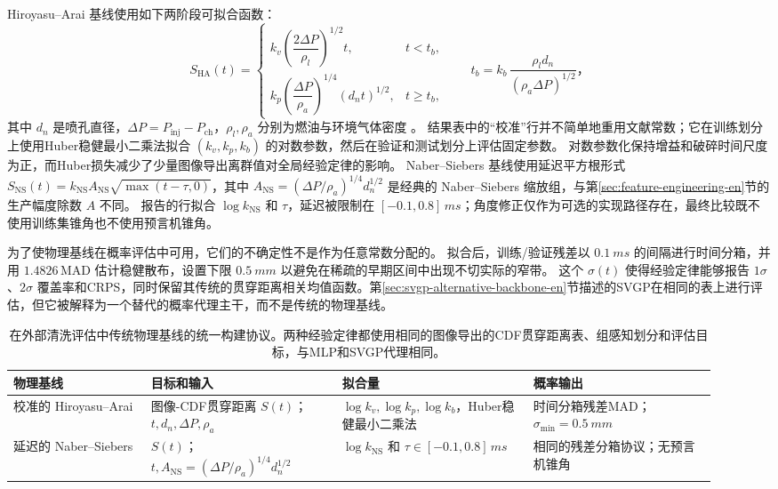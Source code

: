 Hiroyasu--Arai 基线使用如下两阶段可拟合函数：
\[
S_{\mathrm{HA}}(t)=
\begin{cases}
k_v \left( \dfrac{2\Delta P}{\rho_l} \right)^{1/2}t,
& t<t_b,\\[6pt]
k_p \left( \dfrac{\Delta P}{\rho_a} \right)^{1/4}(d_n t)^{1/2},
& t\ge t_b,
\end{cases}
\qquad
t_b=k_b\,\frac{\rho_l d_n}{(\rho_a\Delta P)^{1/2}}，
\]
其中 $d_n$ 是喷孔直径，$\Delta P=P_{\mathrm{inj}}-P_{\mathrm{ch}}$，$\rho_l,\rho_a$ 分别为燃油与环境气体密度 \cite{HiroyasuArai1990}。
结果表中的“校准”行并不简单地重用文献常数；它在训练划分上使用Huber稳健最小二乘法拟合 $(k_v,k_p,k_b)$ 的对数参数，然后在验证和测试划分上评估固定参数。
对数参数化保持增益和破碎时间尺度为正，而Huber损失减少了少量图像导出离群值对全局经验定律的影响。
Naber--Siebers 基线使用延迟平方根形式 $S_{\mathrm{NS}}(t)=k_{\mathrm{NS}}A_{\mathrm{NS}}\sqrt{\max(t-\tau,0)}$，其中 $A_{\mathrm{NS}}=(\Delta P/\rho_a)^{1/4}d_n^{1/2}$ 是经典的 Naber--Siebers 缩放组，与第\ref{sec:feature-engineering-en}节的生产幅度除数 $A$ 不同。
报告的行拟合 $\log k_{\mathrm{NS}}$ 和 $\tau$，延迟被限制在 $[-0.1,0.8]\,\si{ms}$；角度修正仅作为可选的实现路径存在，最终比较既不使用训练集锥角也不使用预言机锥角。

为了使物理基线在概率评估中可用，它们的不确定性不是作为任意常数分配的。
拟合后，训练/验证残差以 $\SI{0.1}{ms}$ 的间隔进行时间分箱，并用 $1.4826\,\mathrm{MAD}$ 估计稳健散布，设置下限 $\SI{0.5}{mm}$ 以避免在稀疏的早期区间中出现不切实际的窄带。
这个 $\sigma(t)$ 使得经验定律能够报告 $1\sigma$、$2\sigma$ 覆盖率和CRPS，同时保留其传统的贯穿距离相关均值函数。第\ref{sec:svgp-alternative-backbone-en}节描述的SVGP在相同的表上进行评估，但它被解释为一个替代的概率代理主干，而不是传统的物理基线。

\begin{table}[t]
\centering
\footnotesize
\setlength{\tabcolsep}{3pt}
\begin{tabular}{@{}L{0.18\linewidth}L{0.25\linewidth}L{0.25\linewidth}L{0.24\linewidth}@{}}
\toprule
物理基线 & 目标和输入 & 拟合量 & 概率输出 \\
\midrule
校准的 Hiroyasu--Arai &
图像-CDF贯穿距离 \(S(t)\)；\(t,d_n,\Delta P,\rho_a\) &
\(\log k_v,\log k_p,\log k_b\)，Huber稳健最小二乘法 &
时间分箱残差MAD；\(\sigma_{\min}=\SI{0.5}{mm}\) \\
\midrule
延迟的 Naber--Siebers &
\(S(t)\)；\(t,A_{\mathrm{NS}}=(\Delta P/\rho_a)^{1/4}d_n^{1/2}\) &
\(\log k_{\mathrm{NS}}\) 和 \(\tau\in[-0.1,0.8]\,\si{ms}\) &
相同的残差分箱协议；无预言机锥角 \\
\bottomrule
\end{tabular}
\caption{在外部清洗评估中传统物理基线的统一构建协议。两种经验定律都使用相同的图像导出的CDF贯穿距离表、组感知划分和评估目标，与MLP和SVGP代理相同。}
\label{tab:baseline-fitting-protocol-en}
\end{table}

